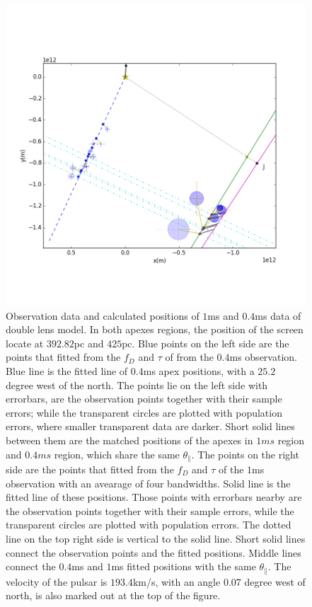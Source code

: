 \documentclass{emulateapj}
\begin{document}
\begin{figure}
\centering
\includegraphics[width=1.0\textwidth, angle=0]{Double_lens_xy.png}
\caption{Observation data and calculated positions of $1$ms and $0.4$ms data of double lens model. In both apexes regions, the position of the screen locate at $392.82$pc and $425$pc. Blue points on the left side are the points that fitted from the $f_D$ and $\tau$ of from the $0.4$ms observation. Blue line is the fitted line of $0.4$ms apex positions, with a $25.2$ degree west of the north. The points lie on the left side with errorbars, are the observation points together with their sample errors; while the transparent circles are plotted with population errors, where smaller transparent data are darker. Short solid lines between them are the matched positions of the apexes in $1ms$ region and $0.4ms$ region, which share the same $\theta_{\parallel}$. The points on the right side are the points that fitted from the $f_D$ and $\tau$ of the $1$ms observation with an avearage of four bandwidths. Solid line is the fitted line of these positions. Those points with errorbars nearby are the observation points together with their sample errors, while the transparent circles are plotted with population errors. The dotted line on the top right side is vertical to the solid line. Short solid lines connect the observation points and the fitted positions. Middle lines connect the $0.4$ms and $1$ms fitted positions with the same $\theta_{\parallel}$. The velocity of the pulsar is $193.4$km/s, with an angle $0.07$ degree west of north, is also marked out at the top of the figure.  }
\label{Doublelens}
\end{figure}
\end{document}
